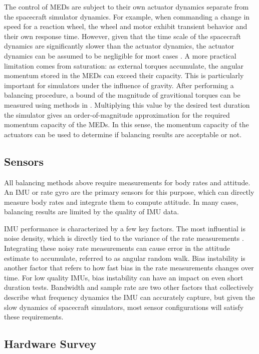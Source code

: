 The control of MEDs are subject to their own actuator dynamics separate from the spacecraft simulator dynamics. For example, when commanding a change in speed for a reaction wheel, the wheel and motor exhibit transient behavior and their own response time. However, given that the time scale of the spacecraft dynamics are significantly slower than the actuator dynamics, the actuator dynamics can be assumed to be negligible for most cases \cite{kristiansen_modelling_2009}. A more practical limitation comes from saturation: as external torques accumulate, the angular momentum stored in the MEDs can exceed their capacity. This is particularly important for simulators under the influence of gravity. After performing a balancing procedure, a bound of the magnitude of gravitional torques can be measured using methods in . Multiplying this value by the desired test duration the simulator gives an order-of-magnitude approximation for the required momentum capacity of the MEDs. In this sense, the momentum capacity of the actuators can be used to determine if balancing results are acceptable or not.

\subsection{Sensors}

All balancing methods above require measurements for body rates and attitude. An IMU or rate gyro are the primary sensors for this purpose, which can directly measure body rates and integrate them to compute attitude. In many cases, balancing results are limited by the quality of IMU data. 

IMU performance is characterized by a few key factors. The most influential is noise density, which is directly tied to the variance of the rate measurements \cite{unsal_estimation_2012}. Integrating these noisy rate measurements can cause error in the attitude estimate to accumulate, referred to as angular random walk. Bias instability is another factor that refers to how fast bias in the rate measurements changes over time. For low quality IMUs, bias instability can have an impact on even short duration tests. Bandwidth and sample rate are two other factors that collectively describe what frequency dynamics the IMU can accurately capture, but given the slow dynamics of spacecraft simulators, most sensor configurations will satisfy these requirements.

\subsection{Hardware Survey}

